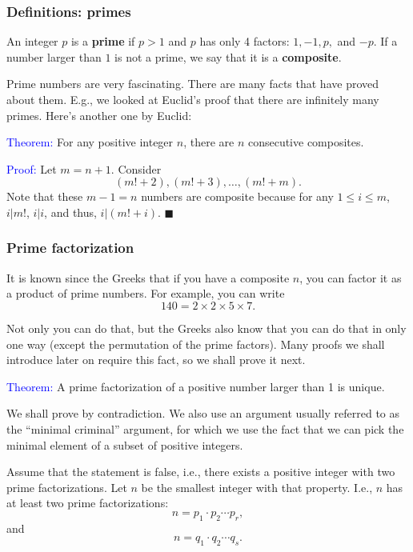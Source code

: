 \begin{frame}\frametitle{Definitions: primes}
  \begin{tcolorbox}
    An integer $p$ is a {\bf prime} if $p>1$ and $p$ has only 4
    factors: $1,-1,p,$ and $-p$.  If a number larger than $1$ is not a
    prime, we say that it is a {\bf composite}.
  \end{tcolorbox}

  Prime numbers are very fascinating.  There are many facts that have
  proved about them.  E.g., we looked at Euclid's proof that there are
  infinitely many primes.  Here's another one by Euclid:

  {\small
    \begin{tcolorbox}
      \textcolor{blue}{Theorem:} For any positive integer $n$, there
      are $n$ consecutive composites.
      
      \textcolor{blue}{Proof:} Let $m=n+1$.  Consider
      \[
      (m!+2),(m!+3),\ldots,(m!+m).
      \]
      Note that these $m-1=n$ numbers are composite because for any
      $1\leq i\leq m$, $i|m!$, $i|i$, and thus,
      $i|(m!+i)$. $\blacksquare$
    \end{tcolorbox}
  }
\end{frame}

\begin{frame}\frametitle{Prime factorization}
  It is known since the Greeks that if you have a composite $n$, you
  can factor it as a product of prime numbers.  For example, you can
  write
  \[ 140 = 2\times 2\times 5\times 7. \]

  \vspace{0.1in} Not only you can do that, but the Greeks also know
  that you can do that in only one way (except the permutation of the
  prime factors).  Many proofs we shall introduce later on require
  this fact, so we shall prove it next.
\end{frame}

\begin{frame}
  \textcolor{blue}{Theorem:} A prime factorization of a positive
  number larger than 1 is unique.

  \begin{tcolorbox}[title=Proof]
  We shall prove by contradiction.  We also
  use an argument usually referred to as the ``minimal criminal''
  argument, for which we use the fact that we can pick the minimal
  element of a subset of positive integers.

  \vspace{0.1in}
  Assume that the statement is false, i.e., there exists a positive
  integer with two prime factorizations.  Let $n$ be the smallest
  integer with that property.  I.e., $n$ has at least two prime
  factorizations:
  \[ n = p_1 \cdot p_2 \cdots p_r, \]
  and
  \[ n = q_1 \cdot q_2 \cdots q_s.\]
  \end{tcolorbox}
\end{frame}

